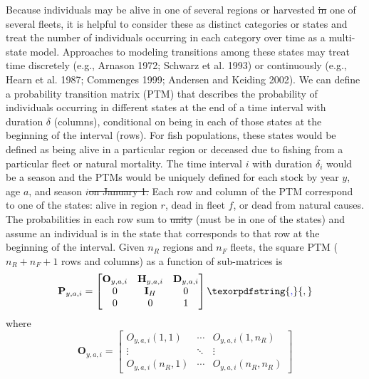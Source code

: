 \documentclass[
]{article}
\makeatletter
\providecommand{\DIFaddtex}[1]{{\protect\color{blue}\uwave{#1}}} %
\providecommand{\DIFdeltex}[1]{{\protect\color{red}\sout{#1}}} %
\providecommand{\DIFaddbegin}{} %
\providecommand{\DIFaddend}{} %
\providecommand{\DIFdelbegin}{} %
\providecommand{\DIFdelend}{} %
\providecommand{\DIFadd}[1]{\texorpdfstring{\DIFaddtex{#1}}{#1}} %
\providecommand{\DIFdel}[1]{\texorpdfstring{\DIFdeltex{#1}}{}} %
\newcommand{\DIFscaledelfig}{0.5}
\newlength{\DIFdelgraphicswidth} %
\newlength{\DIFdelgraphicsheight} %
\newcommand{\DIFaddincludegraphics}[2][]{{\color{blue}\fbox{\DIFOincludegraphics[#1]{#2}}}} %
\newcommand{\DIFdelincludegraphics}[2][]{%
\sbox{\DIFdelgraphicsbox}{\DIFOincludegraphics[#1]{#2}}%
\settoboxwidth{\DIFdelgraphicswidth}{\DIFdelgraphicsbox} %
\settoboxtotalheight{\DIFdelgraphicsheight}{\DIFdelgraphicsbox} %
\scalebox{\DIFscaledelfig}{%
\parbox[b]{\DIFdelgraphicswidth}{\usebox{\DIFdelgraphicsbox}\\[-\baselineskip] \rule{\DIFdelgraphicswidth}{0em}}\llap{\resizebox{\DIFdelgraphicswidth}{\DIFdelgraphicsheight}{%
\setlength{\unitlength}{\DIFdelgraphicswidth}%
\begin{picture}(1,1)%
\thicklines\linethickness{2pt} %
{\color[rgb]{1,0,0}\put(0,0){\framebox(1,1){}}}%
{\color[rgb]{1,0,0}\put(0,0){\line( 1,1){1}}}%
{\color[rgb]{1,0,0}\put(0,1){\line(1,-1){1}}}%
\end{picture}%
}\hspace*{3pt}}} %
} %
\DeclareRobustCommand{\DIFaddbegin}{\DIFOaddbegin \let\includegraphics\DIFaddincludegraphics} %
\DeclareRobustCommand{\DIFaddend}{\DIFOaddend \let\includegraphics\DIFOincludegraphics} %
\DeclareRobustCommand{\DIFdelbegin}{\DIFOdelbegin \let\includegraphics\DIFdelincludegraphics} %
\DeclareRobustCommand{\DIFdelend}{\DIFOaddend \let\includegraphics\DIFOincludegraphics} %
\let\sout@orig\sout %
\renewcommand{\sout}[1]{\ifmmode\text{\sout@orig{\ensuremath{#1}}}\else\sout@orig{#1}\fi} %
\makeatother
\begin{document}
Because individuals may be alive in one of several regions or harvested \DIFdelbegin \DIFdel{in }\DIFdelend \DIFaddbegin \DIFadd{by }\DIFaddend one of several fleets, it is helpful to consider these as distinct categories or states and treat the number of individuals occurring in each category over time as a multi-state model. Approaches to modeling transitions among these states may treat time discretely (e.g., Arnason 1972; Schwarz et al. 1993) or continuously (e.g., Hearn et al. 1987; Commenges 1999; Andersen and Keiding 2002). We can define a probability transition matrix (PTM) that describes the probability of individuals occurring in different states at the end of a time interval with duration \(\delta\) (columns), conditional on being in each of those states at the beginning of the interval (rows). For fish populations, these states would be defined as being alive in a particular region or deceased due to fishing from a particular fleet or natural mortality. The time interval \(i\) with duration \(\delta_i\) would be a season and the PTMs would be uniquely defined for each stock by year \(y\), age \(a\), and season \(i\)\DIFdelbegin \DIFdel{on January 1. }\DIFdelend \DIFaddbegin \DIFadd{. }\DIFaddend Each row and column of the PTM correspond to one of the states: alive in region \(r\), dead in fleet \(f\), or dead from natural causes. The probabilities in each row sum to \DIFdelbegin \DIFdel{unity }\DIFdelend \DIFaddbegin \DIFadd{one }\DIFaddend (must be in one of the states) and assume an individual is in the state that corresponds to that row at the beginning of the interval. Given \(n_R\) regions and \(n_F\) fleets, the square PTM (\(n_R + n_F + 1\) rows and columns) as a function of sub-matrices is
\begin{equation}\label{eq:ptm}
  \mathbf{P}_{y,a,i} = \begin{bmatrix}
    \mathbf{O}_{y,a,i} & \mathbf{H}_{y,a,i} & \mathbf{D}_{y,a,i} \\
    0 & \mathbf{I}_{H} & 0\\
    0 & 0 & 1
  \end{bmatrix}\DIFaddbegin \DIFadd{,
}\DIFaddend \end{equation}
where
\begin{equation*}
  \mathbf{O}_{y,a,i} = 
  \begin{bmatrix}
    O_{y,a,i}(1,1) & \cdots & O_{y,a,i}(1,n_R) \\
    \vdots & \ddots & \vdots \\
    O_{y,a,i}(n_R,1) & \cdots & O_{y,a,i}(n_R,n_R)
  \end{bmatrix}
\end{equation*}
\end{document}
